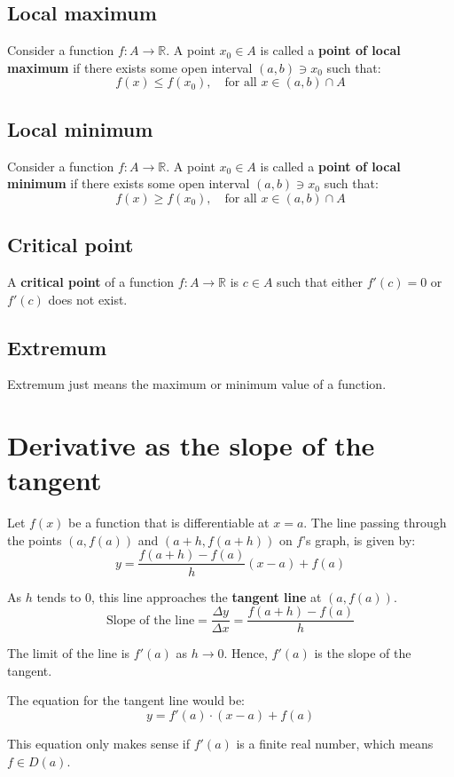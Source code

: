 \documentclass[11pt]{article}
\begin{document}
\subsection{Local maximum}
\label{sec:orgfe4b1d3}
Consider a function \(f : A \rightarrow \mathbb{R}\). A point \(x_0 \in A\) is called a \textbf{point of local maximum} if there exists some open interval \((a, b) \ni x_0\) such that:
\[f(x) \le f(x_0), \quad \text{for all } x \in (a, b) \cap A\]
\subsection{Local minimum}
\label{sec:org3f27cab}
Consider a function \(f : A \rightarrow \mathbb{R}\). A point \(x_0 \in A\) is called a \textbf{point of local minimum} if there exists some open interval \((a, b) \ni x_0\) such that:
\[f(x) \ge f(x_0), \quad \text{for all } x \in (a, b) \cap A\]
\subsection{Critical point}
\label{sec:org98a4630}
A \textbf{critical point} of a function \(f : A \rightarrow \mathbb{R}\) is \(c \in A\) such that either \(f'(c) = 0\) or \(f'(c)\) does not exist.
\subsection{Extremum}
\label{sec:org08a6a51}
Extremum just means the maximum or minimum value of a function.

\newpage
\section{Derivative as the slope of the tangent}
\label{sec:orgf3c80f0}
Let \(f(x)\) be a function that is differentiable at \(x = a\). The line passing through the points \((a, f(a))\) and \((a + h, f(a + h))\) on \(f\)'s graph, is given by:
\[y = \frac{f(a + h) - f(a)}{h} (x - a) + f(a)\]

As \(h\) tends to 0, this line approaches the \textbf{tangent line} at \((a, f(a))\).
\[\text{Slope of the line} = \frac{\Delta y}{\Delta x} = \frac{f(a + h) - f(a)}{h}\]

The limit of the line is \(f'(a)\) as \(h \rightarrow 0\). Hence, \(f'(a)\) is the slope of the tangent.


The equation for the tangent line would be:
\[y = f'(a) \cdot (x - a) + f(a)\]

This equation only makes sense if \(f'(a)\) is a finite real number, which means \(f \in D(a)\).
\end{document}
